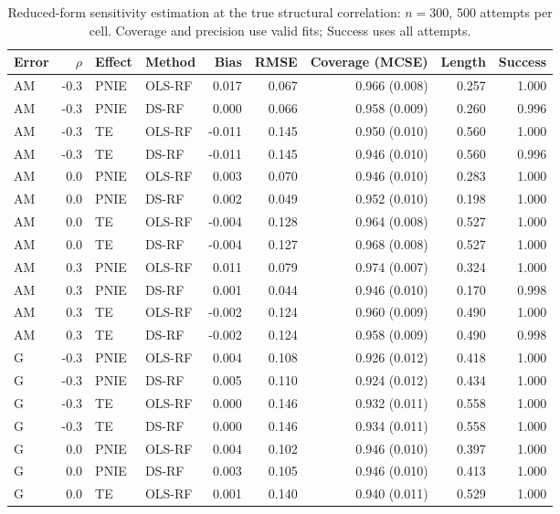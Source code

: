 \begin{table}[htbp]\centering\small\setlength{\tabcolsep}{3pt}
\caption{Reduced-form sensitivity estimation at the true structural correlation: $n=300$, 500 attempts per cell. Coverage and precision use valid fits; Success uses all attempts.}
\label{tab:confounding-simulation}
\begin{tabular}{lrllrrrrr}\toprule
Error & $\rho$ & Effect & Method & Bias & RMSE & Coverage (MCSE) & Length & Success\\\midrule
AM & -0.3 & PNIE & OLS-RF & 0.017 & 0.067 & 0.966 (0.008) & 0.257 & 1.000\\
AM & -0.3 & PNIE & DS-RF & 0.000 & 0.066 & 0.958 (0.009) & 0.260 & 0.996\\
AM & -0.3 & TE & OLS-RF & -0.011 & 0.145 & 0.950 (0.010) & 0.560 & 1.000\\
AM & -0.3 & TE & DS-RF & -0.011 & 0.145 & 0.946 (0.010) & 0.560 & 0.996\\
AM & 0.0 & PNIE & OLS-RF & 0.003 & 0.070 & 0.946 (0.010) & 0.283 & 1.000\\
AM & 0.0 & PNIE & DS-RF & 0.002 & 0.049 & 0.952 (0.010) & 0.198 & 1.000\\
AM & 0.0 & TE & OLS-RF & -0.004 & 0.128 & 0.964 (0.008) & 0.527 & 1.000\\
AM & 0.0 & TE & DS-RF & -0.004 & 0.127 & 0.968 (0.008) & 0.527 & 1.000\\
AM & 0.3 & PNIE & OLS-RF & 0.011 & 0.079 & 0.974 (0.007) & 0.324 & 1.000\\
AM & 0.3 & PNIE & DS-RF & 0.001 & 0.044 & 0.946 (0.010) & 0.170 & 0.998\\
AM & 0.3 & TE & OLS-RF & -0.002 & 0.124 & 0.960 (0.009) & 0.490 & 1.000\\
AM & 0.3 & TE & DS-RF & -0.002 & 0.124 & 0.958 (0.009) & 0.490 & 0.998\\
\midrule
G & -0.3 & PNIE & OLS-RF & 0.004 & 0.108 & 0.926 (0.012) & 0.418 & 1.000\\
G & -0.3 & PNIE & DS-RF & 0.005 & 0.110 & 0.924 (0.012) & 0.434 & 1.000\\
G & -0.3 & TE & OLS-RF & 0.000 & 0.146 & 0.932 (0.011) & 0.558 & 1.000\\
G & -0.3 & TE & DS-RF & 0.000 & 0.146 & 0.934 (0.011) & 0.558 & 1.000\\
G & 0.0 & PNIE & OLS-RF & 0.004 & 0.102 & 0.946 (0.010) & 0.397 & 1.000\\
G & 0.0 & PNIE & DS-RF & 0.003 & 0.105 & 0.946 (0.010) & 0.413 & 1.000\\
G & 0.0 & TE & OLS-RF & 0.001 & 0.140 & 0.940 (0.011) & 0.529 & 1.000\\

\end{tabular}
\end{table}
